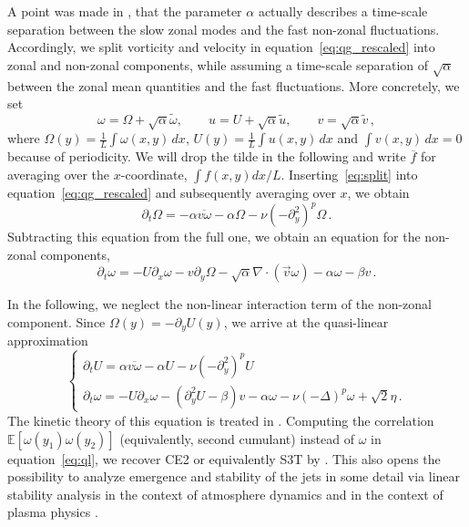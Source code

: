 \documentclass[12pt]{amsart}
\def\EE{\mathbb{E}}\def\PP{\mathbb{P}}
\begin{document}
A point was made in \cite{bouchet-nardini-tangarife:2013}, that the
parameter $\alpha$ actually describes a time-scale separation between
the slow zonal modes and the fast non-zonal fluctuations. Accordingly,
we split vorticity and velocity in equation~\eqref{eq:qg_rescaled}
into zonal and non-zonal components, while assuming a time-scale
separation of $\sqrt{\alpha}$ between the zonal mean quantities and
the fast fluctuations. More concretely, we set
\begin{equation}
  \label{eq:split}
  \omega = \Omega + \sqrt{\alpha}\tilde\omega,\qquad u = U + \sqrt{\alpha}\tilde u,\qquad v = \sqrt{\alpha}\tilde v\,,
\end{equation}
where $\Omega(y)=\frac1L\int \omega(x,y)\,dx$, $U(y)=\frac1L\int
u(x,y)\,dx$ and $\int v(x,y)\,dx=0$ because of periodicity. We will
drop the tilde in the following and write $\overline{ f}$ for
averaging over the $x$-coordinate, $\int f(x,y)
dx/L$. Inserting~\eqref{eq:split} into equation~\eqref{eq:qg_rescaled}
and subsequently averaging over $x$, we obtain
\begin{equation*}
  \partial_t \Omega = -\alpha \overline{v\omega} - \alpha\Omega -\nu(-\partial_y^2)^p\Omega\,.
\end{equation*}
Subtracting this equation from the full one, we obtain an equation for
the non-zonal components,
\begin{equation*}
  \partial_t \omega = -U\partial_x\omega - v\partial_y\Omega-\sqrt{\alpha}\nabla\cdot(\vec v \omega)-\alpha\omega-\beta v\,.
\end{equation*}

In the following, we neglect the non-linear interaction term of the
non-zonal component. Since $\Omega(y)=-\partial_yU(y)$, we arrive at
the quasi-linear approximation
\begin{equation}
  \label{eq:ql}
  \begin{cases}
    \partial_t U = \alpha \overline{v\omega}-\alpha U -\nu(-\partial_y^2)^p U\\
    \partial_t \omega = -U\partial_x \omega-(\partial_y^2 U-\beta)v-\alpha\omega-\nu(-\Delta)^p\omega+\sqrt{2}\eta\,.
  \end{cases}
\end{equation}
The kinetic theory of this equation is treated in
\cite{bouchet-nardini-tangarife:2013}. Computing the correlation
$\EE\left[\omega(y_1)\omega(y_2)\right]$ (equivalently, second
cumulant) instead of $\omega$ in equation~\eqref{eq:ql}, we recover
CE2 \cite{marston-conover-schneider:2008} or equivalently S3T by
\cite{farrell-ioannou:2003, farrell-ioannou:2007}. This also opens the
possibility to analyze emergence and stability of the jets in some
detail via linear stability analysis in the context of atmosphere
dynamics \cite{bakas-ioannou:2011, bakas-ioannou:2013} and in the
context of plasma physics \cite{parker-krommes:2013,
  parker-krommes:2014}.
\end{document}
